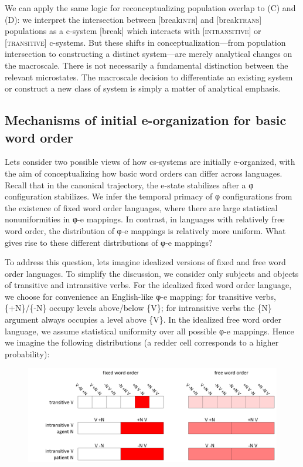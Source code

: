   We can apply the same logic for reconceptualizing population overlap to (C) and (D): we interpret the intersection between [break\textsc{intr}] and [break\textsc{trans}] populations as a c-system [break] which interacts with [\textsc{intransitive}] or [\textsc{transitive}] c-systems. But these shifts in conceptualization—from population intersection to constructing a distinct system—are merely analytical changes on the macroscale. There is not necessarily a fundamental distinction between the relevant microstates. The macroscale decision to differentiate an existing system or construct a new class of system is simply a matter of analytical emphasis.

\subsection{Mechanisms of initial e-organization for basic word order}

Lets consider two possible views of how cs-systems are initially e-organized, with the aim of conceptualizing how basic word orders can differ across languages. Recall that in the canonical trajectory, the e-state stabilizes after a φ configuration stabilizes. We infer the temporal primacy of φ configurations from the existence of fixed word order languages, where there are large statistical nonuniformities in φ-e mappings. In contrast, in languages with relatively free word order, the distribution of φ-e mappings is relatively more uniform. What gives rise to these different distributions of φ-e mappings?

  To address this question, lets imagine idealized versions of fixed and free word order languages. To simplify the discussion, we consider only subjects and objects of transitive and intransitive verbs. For the idealized fixed word order language, we choose for convenience an English-like φ-e mapping: for transitive verbs, \{+N\}/\{-N\} occupy levels above/below \{V\}; for intransitive verbs the \{N\} argument always occupies a level above \{V\}. In the idealized free word order language, we assume statistical uniformity over all possible φ-e mappings. Hence we imagine the following distributions (a redder cell corresponds to a higher probability):

  
\begin{figure}
\includegraphics[width=\textwidth]{figures/Tilsen-img74.png}
\caption{\missingcaption}
\label{fig:}
\end{figure}
 

